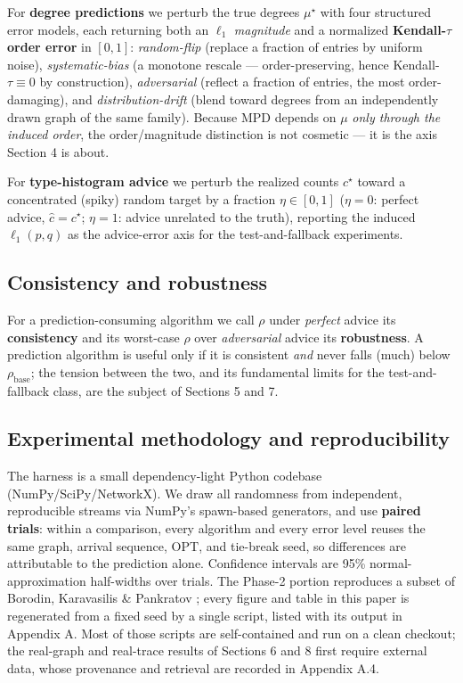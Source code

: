 For \textbf{degree predictions} we perturb the true degrees
\(\mu^\star\) with four structured error models, each returning both an
\(\ell_1\) \emph{magnitude} and a normalized \textbf{Kendall-\(\tau\)
order error} in \([0,1]\): \emph{random-flip} (replace a fraction of
entries by uniform noise), \emph{systematic-bias} (a monotone rescale
--- order-preserving, hence Kendall-\(\tau\equiv 0\) by construction),
\emph{adversarial} (reflect a fraction of entries, the most
order-damaging), and \emph{distribution-drift} (blend toward degrees
from an independently drawn graph of the same family). Because MPD
depends on \(\mu\) \emph{only through the induced order}, the
order/magnitude distinction is not cosmetic --- it is the axis Section 4
is about.

For \textbf{type-histogram advice} we perturb the realized counts
\(c^\star\) toward a concentrated (spiky) random target by a fraction
\(\eta\in[0,1]\) (\(\eta=0\): perfect advice, \(\hat c=c^\star\);
\(\eta=1\): advice unrelated to the truth), reporting the induced
\(\ell_1(p,q)\) as the advice-error axis for the test-and-fallback
experiments.

\subsection{Consistency and
robustness}

For a prediction-consuming algorithm we call \(\rho\) under
\emph{perfect} advice its \textbf{consistency} and its worst-case
\(\rho\) over \emph{adversarial} advice its \textbf{robustness}. A
prediction algorithm is useful only if it is consistent \emph{and} never
falls (much) below \(\rho_{\mathrm{base}}\); the tension between the
two, and its fundamental limits for the test-and-fallback class, are the
subject of Sections 5 and 7.

\subsection{Experimental methodology and
reproducibility}

The harness is a small dependency-light Python codebase
(NumPy/SciPy/NetworkX). We draw all randomness from independent,
reproducible streams via NumPy's spawn-based generators, and use
\textbf{paired trials}: within a comparison, every algorithm and every
error level reuses the same graph, arrival sequence, \(\mathrm{OPT}\),
and tie-break seed, so differences are attributable to the prediction
alone. Confidence intervals are 95\% normal-approximation half-widths
over trials. The Phase-2 portion reproduces a subset of Borodin,
Karavasilis \& Pankratov \cite{borodin2018experimental}; every figure
and table in this paper is regenerated from a fixed seed by a single
script, listed with its output in Appendix A. Most of those scripts are
self-contained and run on a clean checkout; the real-graph and
real-trace results of Sections 6 and 8 first require external data,
whose provenance and retrieval are recorded in Appendix A.4.

